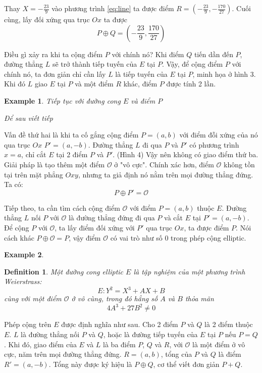 \documentclass[12pt]{article}
\newtheorem{definition}{Definition}
\newtheorem{example}{Example}
\begin{document}
Thay $X=-\frac{23}{9}$ vào phương trình \eqref{eq:line} ta được điểm $R = (-\frac{23}{9}, -\frac{170}{27})$. Cuối cùng, lấy đối xứng qua trục $Ox$ ta được
$$P \oplus Q = (-\frac{23}{9}, \frac{170}{27})$$

Điều gì xảy ra khi ta cộng điểm $P$ với chính nó?
Khi điểm $Q$ tiến dần đến $P$, đường thẳng $L$ sẽ trở thành tiếp tuyến của $E$ tại $P$. Vậy, để cộng điểm $P$ với chính nó, ta đơn giản chỉ cần lấy $L$ là
tiếp tuyến của $E$ tại $P$, minh họa ở hình 3. Khi đó $L$ giao $E$ tại $P$ và một điểm $R$ khác, điểm $P$ được tính 2 lần.

\begin{example}
    \label{ex:ex2}
    Tiếp tục với đường cong $E$ và điểm $P$

    Để sau viết tiếp
\end{example}

Vấn đề thứ hai là khi ta cố gắng cộng điểm $P=(a,b)$ với điểm đỗi xứng của nó qua trục $Ox$ $P'=(a,-b)$.
Đường thẳng $L$ đi qua $P$ và $P'$ có phương trình $x=a$, chỉ cắt $E$ tại 2 điểm $P$ và $P'$. (Hình 4)
Vậy nên không có giao điểm thứ ba. Giải pháp là tạo thêm một điểm $\mathcal{O}$ ở "vô cực".
Chính xác hơn, điểm $\mathcal{O}$ không tồn tại trên mặt phẳng $ Oxy$, nhưng ta giả định nó nằm trên mọi đường thẳng đứng.
Ta có:
$$ P \oplus P' = \mathcal{O}$$

Tiếp theo, ta cần tìm cách  cộng điểm $\mathcal{O}$ với điểm $P = (a,b)$ thuộc $E$.
Đường thẳng $L$ nối $P$ với $\mathcal{O}$ là đường thẳng đứng đi qua $P$ và cắt $E$ tại $P'=(a,-b)$.
Để cộng $P$ với $\mathcal{O}$, ta lấy điểm đối xứng với $P'$ qua trục $Ox$, ta được điểm $P$.
Nói cách khác $P \oplus \mathcal{O} = P$, vậy điểm $\mathcal{O}$ có vai trò như số 0 trong phép cộng elliptic.

\begin{example}
    \label{ex:ex3}
\end{example}

\begin{definition}
    Một đường cong elliptic $E$ là tập nghiệm của một phương trình Weierstrass:
    $$E : Y^2 = X^3 + AX+ B$$
    cùng với một điểm $\mathcal{O}$ ở vô cùng, trong đó hẳng số $A$ và $B$ thỏa mãn
    $$ 4A^3 + 27B^2 \neq 0$$
\end{definition}
\indent Phép cộng trên $E$ được định nghĩa như sau. Cho 2 điểm $P$ và $Q$ là 2 điểm thuộc $E$.
$L$ là đường thẳng nối $P$ và $Q$, hoặc là đường tiếp tuyến của $E$ tại $P$ nếu $P=Q$.
Khi đó, giao điểm của $E$ và $L$ là ba điểm $P$, $Q$ và $R$, với $\mathcal{O}$
là một điểm ở vô cực, năm trên mọi đường thẳng đứng. $R=(a,b)$, tổng của $P$ và $Q$
là điểm $R'=(a,-b)$. Tổng này được ký hiệu là $P \oplus Q$, cơ thể viết đơn giản $P+Q$.
\end{document}
